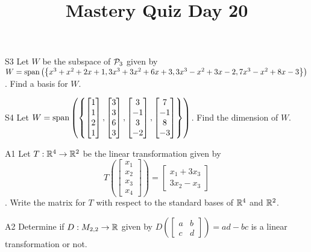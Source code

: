 \documentclass{sbgLAquiz}
\title{Mastery Quiz Day 20 }
\begin{document}
\begin{problem}{S3}
Let $W$ be the subspace of $\P_3$ given by $W = {\rm span} \left( \left\{ x^3+x^2+2x+1, 3x^3+3x^2+6x+3, 3x^3-x^2+3x-2, 7x^3-x^2+8x-3 \right\} \right)$.  Find a basis for $W$.
\end{problem}

\begin{problem}{S4}
Let $W = {\rm span} \left( \left\{ \begin{bmatrix} 1 \\ 1 \\ 2 \\ 1 \end{bmatrix}, \begin{bmatrix} 3 \\ 3 \\ 6 \\ 3 \end{bmatrix}, \begin{bmatrix} 3 \\ -1 \\ 3 \\ -2 \end{bmatrix}, \begin{bmatrix} 7 \\ -1 \\ 8 \\ -3 \end{bmatrix} \right\} \right)$.  Find the dimension of $W$.
\end{problem}
\newpage

\begin{problem}{A1}
Let $T: \IR^4 \rightarrow \IR^2$ be the linear transformation given by $$T\left(\begin{bmatrix} x_1 \\ x_2 \\ x_3 \\ x_4 \end{bmatrix} \right) = \begin{bmatrix} x_1+3x_3 \\ 3x_2-x_3 \end{bmatrix}$$. Write the matrix for $T$ with respect to the standard bases of $\IR^4$ and $\IR^2$.
\end{problem}

\begin{problem}{A2}
Determine if $D: M_{2,2} \rightarrow \IR$ given by $D\left(\begin{bmatrix} a & b \\ c & d \end{bmatrix} \right) = ad-bc$ is a linear transformation or not.
\end{problem}
\end{document}

